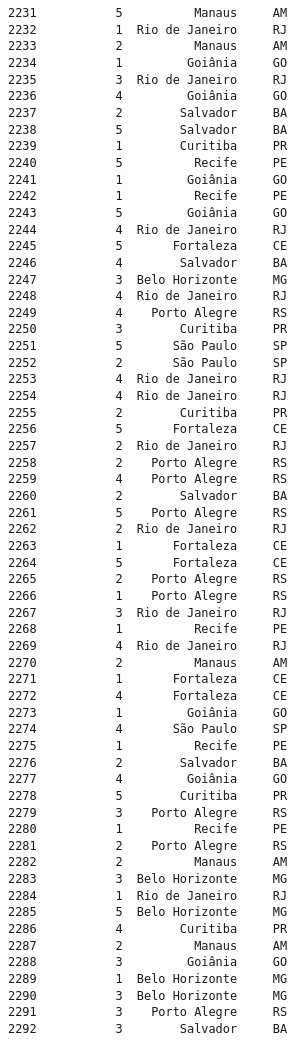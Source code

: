 \documentclass[11pt]{article}
\begin{document}
\begin{Verbatim}[commandchars=\\\{\}]
2231           5          Manaus     AM  
2232           1  Rio de Janeiro     RJ  
2233           2          Manaus     AM  
2234           1         Goiânia     GO  
2235           3  Rio de Janeiro     RJ  
2236           4         Goiânia     GO  
2237           2        Salvador     BA  
2238           5        Salvador     BA  
2239           1        Curitiba     PR  
2240           5          Recife     PE  
2241           1         Goiânia     GO  
2242           1          Recife     PE  
2243           5         Goiânia     GO  
2244           4  Rio de Janeiro     RJ  
2245           5       Fortaleza     CE  
2246           4        Salvador     BA  
2247           3  Belo Horizonte     MG  
2248           4  Rio de Janeiro     RJ  
2249           4    Porto Alegre     RS  
2250           3        Curitiba     PR  
2251           5       São Paulo     SP  
2252           2       São Paulo     SP  
2253           4  Rio de Janeiro     RJ  
2254           4  Rio de Janeiro     RJ  
2255           2        Curitiba     PR  
2256           5       Fortaleza     CE  
2257           2  Rio de Janeiro     RJ  
2258           2    Porto Alegre     RS  
2259           4    Porto Alegre     RS  
2260           2        Salvador     BA  
2261           5    Porto Alegre     RS  
2262           2  Rio de Janeiro     RJ  
2263           1       Fortaleza     CE  
2264           5       Fortaleza     CE  
2265           2    Porto Alegre     RS  
2266           1    Porto Alegre     RS  
2267           3  Rio de Janeiro     RJ  
2268           1          Recife     PE  
2269           4  Rio de Janeiro     RJ  
2270           2          Manaus     AM  
2271           1       Fortaleza     CE  
2272           4       Fortaleza     CE  
2273           1         Goiânia     GO  
2274           4       São Paulo     SP  
2275           1          Recife     PE  
2276           2        Salvador     BA  
2277           4         Goiânia     GO  
2278           5        Curitiba     PR  
2279           3    Porto Alegre     RS  
2280           1          Recife     PE  
2281           2    Porto Alegre     RS  
2282           2          Manaus     AM  
2283           3  Belo Horizonte     MG  
2284           1  Rio de Janeiro     RJ  
2285           5  Belo Horizonte     MG  
2286           4        Curitiba     PR  
2287           2          Manaus     AM  
2288           3         Goiânia     GO  
2289           1  Belo Horizonte     MG  
2290           3  Belo Horizonte     MG  
2291           3    Porto Alegre     RS  
2292           3        Salvador     BA  

\end{Verbatim}
\end{document}
